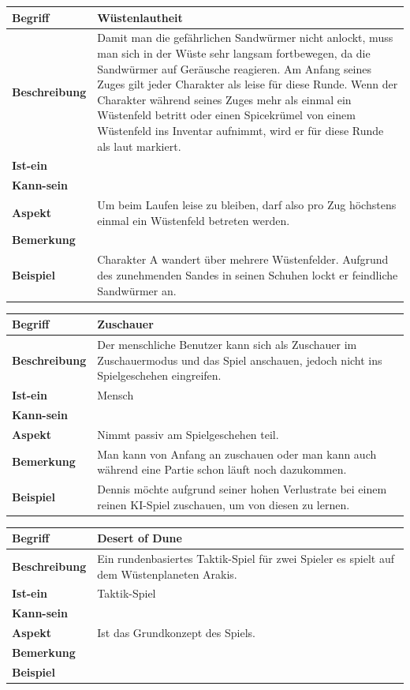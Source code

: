 \documentclass[12pt]{article}
\newcounter{fa}
\newcounter{nfa}
\begin{document}
\begin{tabularx}{\linewidth}{|l|X|}
\hline
\textbf{Begriff} & \textbf{Wüstenlautheit} \\
\hline
\textbf{Beschreibung} & Damit man die gefährlichen Sandwürmer nicht anlockt, muss man sich in der Wüste sehr langsam fortbewegen, da die Sandwürmer auf Geräusche reagieren. Am Anfang seines Zuges gilt jeder Charakter als \glqq{}leise\grqq{} für diese Runde. Wenn der Charakter während seines Zuges mehr als einmal ein Wüstenfeld betritt oder einen Spicekrümel von einem Wüstenfeld ins Inventar aufnimmt, wird er für diese Runde als \glqq{}laut\grqq{} markiert.\\
\hline
\textbf{Ist-ein} & \\
\hline
\textbf{Kann-sein} & \\
\hline
\textbf{Aspekt} & Um beim Laufen leise zu bleiben, darf also pro Zug höchstens einmal ein Wüstenfeld betreten werden.\\
\hline
\textbf{Bemerkung} &  \\
\hline
\textbf{Beispiel} & Charakter A wandert über mehrere Wüstenfelder. Aufgrund des zunehmenden Sandes in seinen Schuhen lockt er feindliche Sandwürmer an. \\
\hline
\end{tabularx}

\begin{tabularx}{\linewidth}{|l|X|}
\hline
\textbf{Begriff} & \textbf{Zuschauer} \\
\hline
\textbf{Beschreibung} & Der menschliche Benutzer kann sich als Zuschauer im Zuschauermodus und das Spiel anschauen, jedoch nicht ins Spielgeschehen eingreifen. \\
\hline
\textbf{Ist-ein} & Mensch\\
\hline
\textbf{Kann-sein} & \\
\hline
\textbf{Aspekt} & Nimmt passiv am Spielgeschehen teil.\\
\hline
\textbf{Bemerkung} & Man kann von Anfang an zuschauen oder man kann auch während eine Partie schon läuft noch dazukommen.\\
\hline
\textbf{Beispiel} &  Dennis möchte aufgrund seiner hohen Verlustrate bei einem reinen KI-Spiel zuschauen, um von diesen zu lernen. \\
\hline
\end{tabularx}

\begin{tabularx}{\linewidth}{|l|X|}
\hline
\textbf{Begriff} & \textbf{Desert of Dune} \\
\hline
\textbf{Beschreibung} & Ein rundenbasiertes Taktik-Spiel für zwei Spieler es spielt auf dem Wüstenplaneten Arakis. \\
\hline
\textbf{Ist-ein} & Taktik-Spiel\\
\hline
\textbf{Kann-sein} & \\
\hline
\textbf{Aspekt} & Ist das Grundkonzept des Spiels. \\
\hline
\textbf{Bemerkung} & \\
\hline
\textbf{Beispiel} &  \\
\hline
\end{tabularx}
\end{document}
